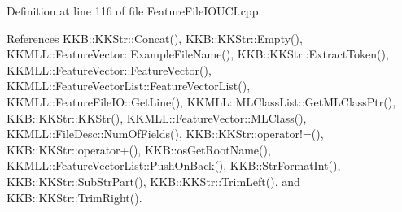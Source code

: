 Definition at line 116 of file Feature\+File\+I\+O\+U\+C\+I.\+cpp.



References K\+K\+B\+::\+K\+K\+Str\+::\+Concat(), K\+K\+B\+::\+K\+K\+Str\+::\+Empty(), K\+K\+M\+L\+L\+::\+Feature\+Vector\+::\+Example\+File\+Name(), K\+K\+B\+::\+K\+K\+Str\+::\+Extract\+Token(), K\+K\+M\+L\+L\+::\+Feature\+Vector\+::\+Feature\+Vector(), K\+K\+M\+L\+L\+::\+Feature\+Vector\+List\+::\+Feature\+Vector\+List(), K\+K\+M\+L\+L\+::\+Feature\+File\+I\+O\+::\+Get\+Line(), K\+K\+M\+L\+L\+::\+M\+L\+Class\+List\+::\+Get\+M\+L\+Class\+Ptr(), K\+K\+B\+::\+K\+K\+Str\+::\+K\+K\+Str(), K\+K\+M\+L\+L\+::\+Feature\+Vector\+::\+M\+L\+Class(), K\+K\+M\+L\+L\+::\+File\+Desc\+::\+Num\+Of\+Fields(), K\+K\+B\+::\+K\+K\+Str\+::operator!=(), K\+K\+B\+::\+K\+K\+Str\+::operator+(), K\+K\+B\+::os\+Get\+Root\+Name(), K\+K\+M\+L\+L\+::\+Feature\+Vector\+List\+::\+Push\+On\+Back(), K\+K\+B\+::\+Str\+Format\+Int(), K\+K\+B\+::\+K\+K\+Str\+::\+Sub\+Str\+Part(), K\+K\+B\+::\+K\+K\+Str\+::\+Trim\+Left(), and K\+K\+B\+::\+K\+K\+Str\+::\+Trim\+Right().


